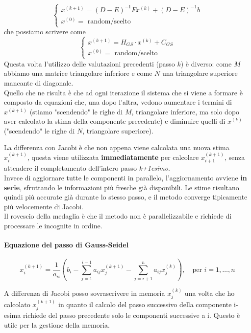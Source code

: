 \documentclass[12pt,a4paper,]{report}
\begin{document}
\begin{metodo}
    \[
    \begin{cases}
    x^{(k+1)} = (D-E)^{-1}F x^{(k)}+(D-E)^{-1}b \\
    x^{(0)} = \text{ random/scelto}
    \end{cases}
    \]
    che possiamo scrivere come 
    \[
    \begin{cases}
    x^{(k+1)} = H_{GS}\cdot x^{(k)}+C_{GS} \\
    x^{(0)} = \text{ random/scelto}
    \end{cases}
    \]
    Questa volta l'utilizzo delle valutazioni precedenti (passo $k$) è diverso: come $M$ abbiamo una matrice triangolare inferiore e come $N$ una triangolare superiore mancante di diagonale.\\
    Quello che ne risulta è che ad ogni iterazione il sistema che si viene a formare è composto da equazioni che, una dopo l'altra, vedono aumentare i termini di $x^{(k+1)}$ (stiamo "scendendo" le righe di $M$, triangolare inferiore, ma solo dopo aver calcolato la stima della componente precedente) e diminuire quelli di $x^{(k)}$ ("scendendo" le righe di $N$, triangolare superiore).
    
    La differenza con Jacobi è che non appena viene calcolata una nuova stima $x_i^{(k+1)}$, questa viene utilizzata \textbf{immediatamente} per calcolare $x_{i+1}^{(k+1)}$, senza attendere il completamento dell'intero passo \textit{k+1esimo}.\\
    Invece di aggiornare tutte le componenti in parallelo, l'aggiornamento
    avviene \textbf{in serie}, sfruttando le informazioni più fresche già
    disponibili. Le stime risultano quindi più accurate già durante lo stesso
    passo, e il metodo converge tipicamente più velocemente di Jacobi.
    \\
    Il rovescio della medaglia è che il metodo non è parallelizzabile e richiede
    di processare le incognite in ordine.
\end{metodo}

\paragraph{Equazione del passo di Gauss-Seidel}
\[
x_i^{(k+1)} = \frac{1}{a_{ii}} \left( b_i - \sum_{j=1}^{i-1} a_{ij} x_j^{(k+1)} - \sum_{j=i+1}^{n} a_{ij} x_j^{(k)} \right), \quad \text{per } i = 1, \dots, n
\]
\begin{nota}
    A differenza di Jacobi posso sovrascrivere in memoria $x_j^{(k)}$ una volta che ho calcolato $x_j^{(k+1)}$ in quanto il calcolo del passo successivo della componente i-esima richiede del passo precedente solo le componenti successive a i. Questo è utile per la gestione della memoria.
\end{nota}
\end{document}
